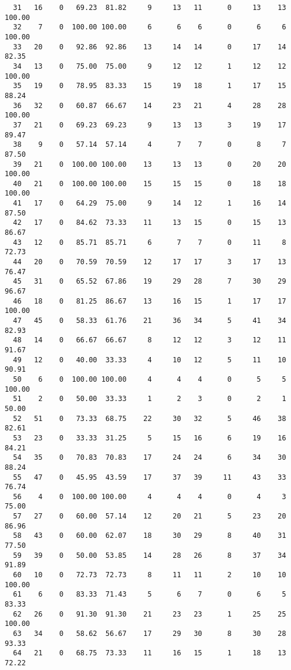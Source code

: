\begin{verbatim}
  31   16    0   69.23  81.82     9     13   11      0     13    13   100.00
  32    7    0  100.00 100.00     6      6    6      0      6     6   100.00
  33   20    0   92.86  92.86    13     14   14      0     17    14    82.35
  34   13    0   75.00  75.00     9     12   12      1     12    12   100.00
  35   19    0   78.95  83.33    15     19   18      1     17    15    88.24
  36   32    0   60.87  66.67    14     23   21      4     28    28   100.00
  37   21    0   69.23  69.23     9     13   13      3     19    17    89.47
  38    9    0   57.14  57.14     4      7    7      0      8     7    87.50
  39   21    0  100.00 100.00    13     13   13      0     20    20   100.00
  40   21    0  100.00 100.00    15     15   15      0     18    18   100.00
  41   17    0   64.29  75.00     9     14   12      1     16    14    87.50
  42   17    0   84.62  73.33    11     13   15      0     15    13    86.67
  43   12    0   85.71  85.71     6      7    7      0     11     8    72.73
  44   20    0   70.59  70.59    12     17   17      3     17    13    76.47
  45   31    0   65.52  67.86    19     29   28      7     30    29    96.67
  46   18    0   81.25  86.67    13     16   15      1     17    17   100.00
  47   45    0   58.33  61.76    21     36   34      5     41    34    82.93
  48   14    0   66.67  66.67     8     12   12      3     12    11    91.67
  49   12    0   40.00  33.33     4     10   12      5     11    10    90.91
  50    6    0  100.00 100.00     4      4    4      0      5     5   100.00
  51    2    0   50.00  33.33     1      2    3      0      2     1    50.00
  52   51    0   73.33  68.75    22     30   32      5     46    38    82.61
  53   23    0   33.33  31.25     5     15   16      6     19    16    84.21
  54   35    0   70.83  70.83    17     24   24      6     34    30    88.24
  55   47    0   45.95  43.59    17     37   39     11     43    33    76.74
  56    4    0  100.00 100.00     4      4    4      0      4     3    75.00
  57   27    0   60.00  57.14    12     20   21      5     23    20    86.96
  58   43    0   60.00  62.07    18     30   29      8     40    31    77.50
  59   39    0   50.00  53.85    14     28   26      8     37    34    91.89
  60   10    0   72.73  72.73     8     11   11      2     10    10   100.00
  61    6    0   83.33  71.43     5      6    7      0      6     5    83.33
  62   26    0   91.30  91.30    21     23   23      1     25    25   100.00
  63   34    0   58.62  56.67    17     29   30      8     30    28    93.33
  64   21    0   68.75  73.33    11     16   15      1     18    13    72.22

\end{verbatim}
